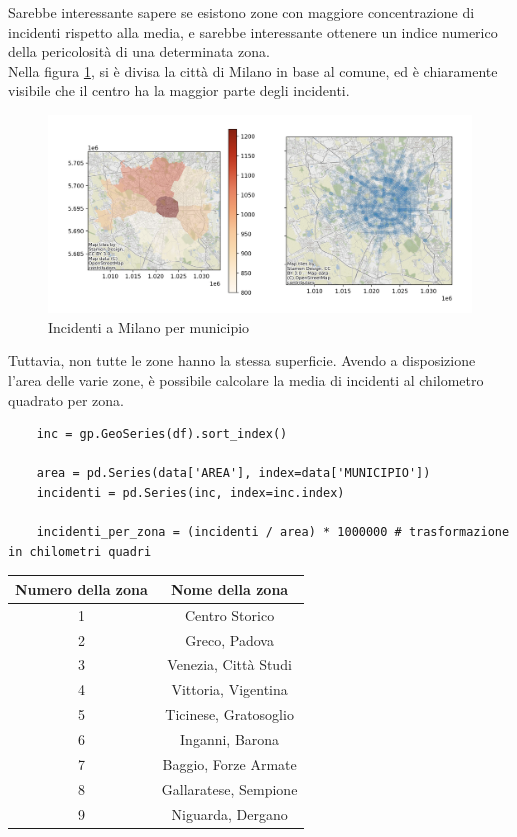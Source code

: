 \documentclass[a4paper]{report}
\begin{document}
Sarebbe interessante sapere se esistono zone con maggiore concentrazione di incidenti rispetto 
alla media, e sarebbe interessante ottenere un indice numerico della pericolosità di una 
determinata zona.\\
Nella figura \ref{fig:heatmap-municipi}, si è divisa la città di Milano in base al comune, ed è 
chiaramente visibile che il centro ha la maggior parte degli incidenti.

\begin{figure}
    \includegraphics[width=\linewidth]{../src/municipi_milano/incidenti_municipio.png}
    \caption{Incidenti a Milano per municipio}
    \label{fig:heatmap-municipi}
\end{figure}

Tuttavia, non tutte le zone hanno la stessa superficie. Avendo a disposizione l'area delle varie zone, 
è possibile calcolare la media di incidenti al chilometro quadrato per zona.

\begin{lstlisting}    
    inc = gp.GeoSeries(df).sort_index()

    area = pd.Series(data['AREA'], index=data['MUNICIPIO'])
    incidenti = pd.Series(inc, index=inc.index)

    incidenti_per_zona = (incidenti / area) * 1000000 # trasformazione in chilometri quadri
\end{lstlisting}

\begin{center}
    \def\arraystretch{1.5}%
    \begin{tabular}{ |c|c| } 
    \hline
    Numero della zona & Nome della zona \\ 
    \hline
    \rowcolor{TableGray}
    1   &   Centro Storico\\
    2   &   Greco, Padova\\
    \rowcolor{TableGray}
    3   &   Venezia, Città Studi\\
    4   &   Vittoria, Vigentina \\
    \rowcolor{TableGray}
    5   &   Ticinese, Gratosoglio\\
    6   &   Inganni, Barona\\
    \rowcolor{TableGray}
    7   &   Baggio, Forze Armate\\
    8   &   Gallaratese, Sempione\\
    \rowcolor{TableGray}
    9   &   Niguarda, Dergano\\
    \hline
    \end{tabular}
\end{center}
\end{document}
